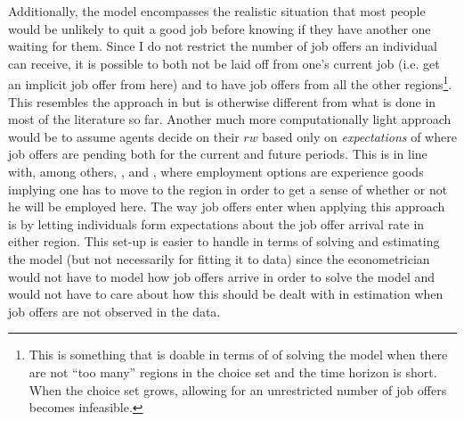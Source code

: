 Additionally, the model encompasses the realistic situation that most people would be unlikely to quit a good job before knowing if they have another one waiting for them. Since I do not restrict the number of job offers an individual can receive, it is possible to both not be laid off from one's current job (i.e. get an implicit job offer from here) and to have job offers from all the other regions\footnote{This is something that is doable in terms of of solving the model when there are not ``too many'' regions in the choice set and the time horizon is short. When the choice set grows, allowing for an unrestricted number of job offers becomes infeasible.}. This resembles the approach in \citet{Buchinsky2014} but is otherwise different from what is done in most of the literature so far. Another much more computationally light approach would be to assume agents decide on their $rw$ based only on \textit{expectations} of where job offers are pending both for the current and future periods. This is in line with, among others, \citet{KennanWalker2011}, \citet{Oswald2015} and \citet{Ransom2016}, where employment options are experience goods implying one has to move to the region in order to get a sense of whether or not he will be employed here. The way job offers enter when applying this approach is by letting individuals form expectations about the job offer arrival rate in either region. This set-up is easier to handle in terms of solving and estimating the model (but not necessarily for fitting it to data) since the econometrician would not have to model how job offers arrive in order to solve the model and would not have to care about how this should be dealt with in estimation when job offers are not observed in the data.

